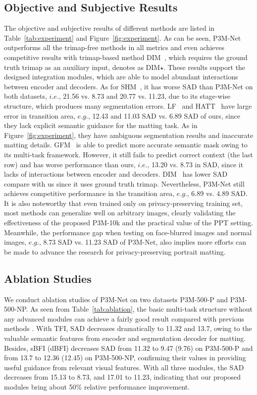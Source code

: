 \documentclass[sigconf]{acmart}
\begin{document}
\subsection{Objective and Subjective Results}
The objective and subjective results of different methods are listed in Table~\ref{tab:experiment} and Figure~\ref{fig:experiment}. As can be seen, P3M-Net outperforms all the trimap-free methods in all metrics and even achieves competitive results with trimap-based method DIM~\cite{dim}, which requires the ground truth trimap as an auxiliary input, denotes as DIM$\star$. These results support the designed integration modules, which are able to model abundant interactions between encoder and decoders. As for SHM~\cite{shm}, it has worse SAD than P3M-Net on both datasets, $i.e.$, 21.56 vs. 8.73 and 20.77 vs. 11.23, due to its stage-wise structure, which produces many segmentation errors. LF~\cite{lf} and HATT~\cite{hatt} have large error in transition area, $e.g.$, 12.43 and 11.03 SAD vs. 6.89 SAD of ours, since they lack explicit semantic guidance for the matting task. As in Figure~\ref{fig:experiment}, they have ambiguous segmentation results and inaccurate matting details. GFM~\cite{gfm} is able to predict more accurate semantic mask owing to its multi-task framework. However, it still fails to predict correct context (the last row) and has worse performance than ours, $i.e.$, 13.20 vs. 8.73 in SAD, since it lacks of interactions between encoder and decoders. DIM~\cite{dim} has lower SAD compare with us since it uses ground truth trimap. Nevertheless, P3M-Net still achieves competitive performance in the transition area, $e.g.$, 6.89 vs. 4.89 SAD. It is also noteworthy that even trained only on privacy-preserving training set, most methods can generalize well on arbitrary images, clearly validating the effectiveness of the proposed P3M-10k and the practical value of the PPT setting. Meanwhile, the performance gap when testing on face-blurred images and normal images, $e.g.$, 8.73 SAD vs. 11.23 SAD of P3M-Net, also implies more efforts can be made to advance the research for privacy-preserving portrait matting.

\subsection{Ablation Studies}
We conduct ablation studies of P3M-Net on two datasets P3M-500-P and P3M-500-NP. As seen from Table~\ref{tab:ablation}, the basic multi-task structure without any advanced modules can achieve a fairly good result compared with previous methods \cite{shm,hatt,lf}. With TFI, SAD decreases dramatically to 11.32 and 13.7, owing to the valuable semantic features from encoder and segmentation decoder for matting. Besides, sBFI (dBFI) decreases SAD from 11.32 to 9.47 (9.76) on P3M-500-P and from 13.7 to 12.36 (12.45) on P3M-500-NP, confirming their values in providing useful guidance from relevant visual features. With all three modules, the SAD decreases from 15.13 to 8.73, and 17.01 to 11.23, indicating that our proposed modules bring about 50\% relative performance improvement.
\end{document}
